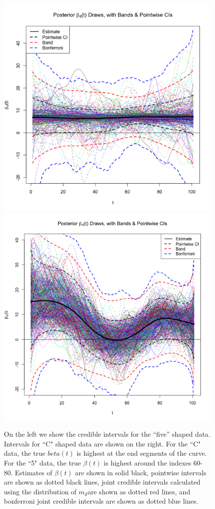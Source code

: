 \documentclass[12pt]{article}
\begin{document}
\begin{figure}[h!]
\caption[]{\footnotesize On the left we show the credible intervals for the ``five'' shaped data. Intervals for ``C" shaped data are shown on the right. For the ``C" data, the true $beta(t)$ is highest at the end segments of the curve. For the ``5" data, the true $\beta(t)$ is highest around the indexes 60-80. Estimates of $\beta(t)$ are shown in solid black, pointwise intervals are shown as dotted black lines, joint credible intervals calculated using the distribution of $m_d$are shown as dotted red lines, and bonferroni joint credible intervals are shown as dotted blue lines.}
\includegraphics[scale=.45]{pics/Figure_Bands_5_Shape_12-19-12_bonf.png} \includegraphics[scale=.41]{pics/Figure_Bands_C_Shape_12-19-12_bonf.png}
\label{fig.bands}
\end{figure}
\end{document}
